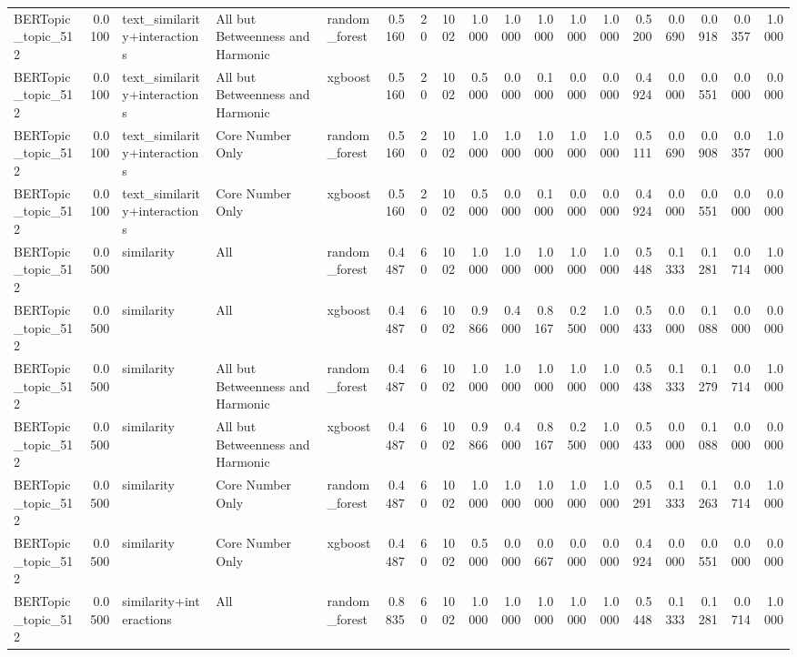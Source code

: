 \begin{tabular}{lrlllrrrrrrrrrrrrr}
BERTopic_topic_512 & 0.0100 & text_similarity+interactions & All but Betweenness and Harmonic & random_forest & 0.5160 & 20 & 1002 & 1.0000 & 1.0000 & 1.0000 & 1.0000 & 1.0000 & 0.5200 & 0.0690 & 0.0918 & 0.0357 & 1.0000 \\
BERTopic_topic_512 & 0.0100 & text_similarity+interactions & All but Betweenness and Harmonic & xgboost & 0.5160 & 20 & 1002 & 0.5000 & 0.0000 & 0.1000 & 0.0000 & 0.0000 & 0.4924 & 0.0000 & 0.0551 & 0.0000 & 0.0000 \\
BERTopic_topic_512 & 0.0100 & text_similarity+interactions & Core Number Only & random_forest & 0.5160 & 20 & 1002 & 1.0000 & 1.0000 & 1.0000 & 1.0000 & 1.0000 & 0.5111 & 0.0690 & 0.0908 & 0.0357 & 1.0000 \\
BERTopic_topic_512 & 0.0100 & text_similarity+interactions & Core Number Only & xgboost & 0.5160 & 20 & 1002 & 0.5000 & 0.0000 & 0.1000 & 0.0000 & 0.0000 & 0.4924 & 0.0000 & 0.0551 & 0.0000 & 0.0000 \\
BERTopic_topic_512 & 0.0500 & similarity & All & random_forest & 0.4487 & 60 & 1002 & 1.0000 & 1.0000 & 1.0000 & 1.0000 & 1.0000 & 0.5448 & 0.1333 & 0.1281 & 0.0714 & 1.0000 \\
BERTopic_topic_512 & 0.0500 & similarity & All & xgboost & 0.4487 & 60 & 1002 & 0.9866 & 0.4000 & 0.8167 & 0.2500 & 1.0000 & 0.5433 & 0.0000 & 0.1088 & 0.0000 & 0.0000 \\
BERTopic_topic_512 & 0.0500 & similarity & All but Betweenness and Harmonic & random_forest & 0.4487 & 60 & 1002 & 1.0000 & 1.0000 & 1.0000 & 1.0000 & 1.0000 & 0.5438 & 0.1333 & 0.1279 & 0.0714 & 1.0000 \\
BERTopic_topic_512 & 0.0500 & similarity & All but Betweenness and Harmonic & xgboost & 0.4487 & 60 & 1002 & 0.9866 & 0.4000 & 0.8167 & 0.2500 & 1.0000 & 0.5433 & 0.0000 & 0.1088 & 0.0000 & 0.0000 \\
BERTopic_topic_512 & 0.0500 & similarity & Core Number Only & random_forest & 0.4487 & 60 & 1002 & 1.0000 & 1.0000 & 1.0000 & 1.0000 & 1.0000 & 0.5291 & 0.1333 & 0.1263 & 0.0714 & 1.0000 \\
BERTopic_topic_512 & 0.0500 & similarity & Core Number Only & xgboost & 0.4487 & 60 & 1002 & 0.5000 & 0.0000 & 0.0667 & 0.0000 & 0.0000 & 0.4924 & 0.0000 & 0.0551 & 0.0000 & 0.0000 \\
BERTopic_topic_512 & 0.0500 & similarity+interactions & All & random_forest & 0.8835 & 60 & 1002 & 1.0000 & 1.0000 & 1.0000 & 1.0000 & 1.0000 & 0.5448 & 0.1333 & 0.1281 & 0.0714 & 1.0000 \\

\end{tabular}
